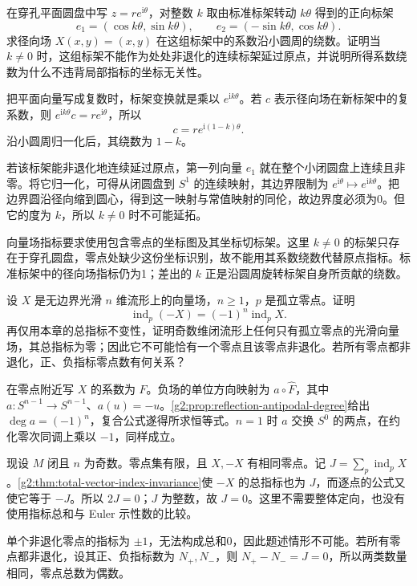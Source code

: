 \begin{exercise}\label{g2:ex:punctured-rotating-frame-index}
	在穿孔平面圆盘中写 \(z=r e^{\mathrm i\theta}\)，对整数 \(k\) 取由标准标架转动 \(k\theta\) 得到的正向标架
	\[
		e_1=(\cos k\theta,\sin k\theta),\qquad
		e_2=(-\sin k\theta,\cos k\theta).
	\]
	求径向场 \(X(x,y)=(x,y)\) 在这组标架中的系数沿小圆周的绕数。证明当 \(k\ne0\) 时，这组标架不能作为处处非退化的连续标架延过原点，并说明所得系数绕数为什么不违背局部指标的坐标无关性。
\end{exercise}
\begin{solution}
	把平面向量写成复数时，标架变换就是乘以 \(e^{\mathrm ik\theta}\)。若 \(c\) 表示径向场在新标架中的复系数，则 \(e^{\mathrm ik\theta}c=r e^{\mathrm i\theta}\)，所以
	\[
		c=r e^{\mathrm i(1-k)\theta}.
	\]
	沿小圆周归一化后，其绕数为 \(1-k\)。

	若该标架能非退化地连续延过原点，第一列向量 \(e_1\) 就在整个小闭圆盘上连续且非零。将它归一化，可得从闭圆盘到 \(S^1\) 的连续映射，其边界限制为 \(e^{\mathrm i\theta}\mapsto e^{\mathrm ik\theta}\)。把边界圆沿径向缩到圆心，得到这一映射与常值映射的同伦，故边界度必须为0。但它的度为 \(k\)，所以 \(k\ne0\) 时不可能延拓。

	向量场指标要求使用包含零点的坐标图及其坐标切标架。这里 \(k\ne0\) 的标架只存在于穿孔圆盘，零点处缺少这份坐标识别，故不能用其系数绕数代替原点指标。标准标架中的径向场指标仍为1；差出的 \(k\) 正是沿圆周旋转标架自身所贡献的绕数。
\end{solution}

\begin{exercise}\label{g2:ex:odd-dimensional-total-index}
	设 \(X\) 是无边界光滑 \(n\) 维流形上的向量场，\(n\ge1\)，\(p\) 是孤立零点。证明
	\[
		\operatorname{ind}_p(-X)=(-1)^n\operatorname{ind}_pX.
	\]
	再仅用本章的总指标不变性，证明奇数维闭流形上任何只有孤立零点的光滑向量场，其总指标为零；因此它不可能恰有一个零点且该零点非退化。若所有零点都非退化，正、负指标零点数有何关系？
\end{exercise}
\begin{solution}
	在零点附近写 \(X\) 的系数为 \(F\)。负场的单位方向映射为 \(a\circ\widehat F\)，其中 \(a:S^{n-1}\to S^{n-1}\)、\(a(u)=-u\)。\cref{g2:prop:reflection-antipodal-degree}给出 \(\deg a=(-1)^n\)，复合公式遂得所求恒等式。\(n=1\) 时 \(a\) 交换 \(S^0\) 的两点，在约化零次同调上乘以 \(-1\)，同样成立。

	现设 \(M\) 闭且 \(n\) 为奇数。零点集有限，且 \(X,-X\) 有相同零点。记 \(J=\sum_p\operatorname{ind}_pX\)。\cref{g2:thm:total-vector-index-invariance}使 \(-X\) 的总指标也为 \(J\)，而逐点的公式又使它等于 \(-J\)。所以 \(2J=0\)；\(J\) 为整数，故 \(J=0\)。这里不需要整体定向，也没有使用指标总和与 Euler 示性数的比较。

	单个非退化零点的指标为 \(\pm1\)，无法构成总和0，因此题述情形不可能。若所有零点都非退化，设其正、负指标数为 \(N_+,N_-\)，则 \(N_+-N_-=J=0\)，所以两类数量相同，零点总数为偶数。
\end{solution}

